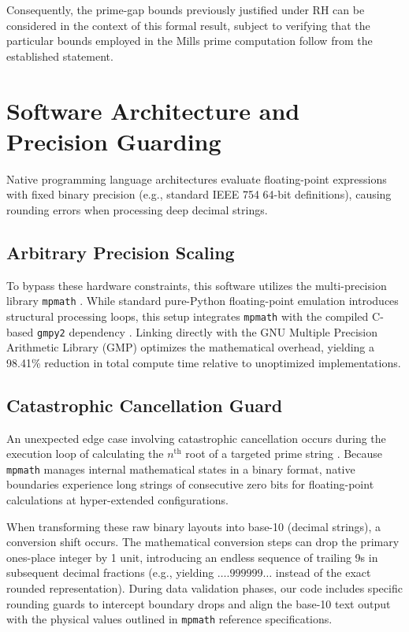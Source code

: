 \documentclass{article}
\begin{document}
Consequently, the prime-gap bounds previously justified under RH can be considered in the context of this formal result, subject to verifying that the particular bounds employed in the Mills prime computation follow from the established statement.
\section{Software Architecture and Precision Guarding}
Native programming language architectures evaluate floating-point expressions with fixed binary precision (e.g., standard IEEE 754 64-bit definitions), causing rounding errors when processing deep decimal strings.

\subsection{Arbitrary Precision Scaling}
To bypass these hardware constraints, this software utilizes the multi-precision library \texttt{mpmath} \cite{mpmathIndex}. While standard pure-Python floating-point emulation introduces structural processing loops, this setup integrates \texttt{mpmath} with the compiled C-based \texttt{gmpy2} dependency \cite{mpmathGmpy}. Linking directly with the GNU Multiple Precision Arithmetic Library (GMP) optimizes the mathematical overhead, yielding a 98.41\% reduction in total compute time relative to unoptimized implementations.

\subsection{Catastrophic Cancellation Guard}
An unexpected edge case involving catastrophic cancellation occurs during the execution loop of calculating the $n^{\text{th}}$ root of a targeted prime string \cite{mpmathRoots}. Because \texttt{mpmath} manages internal mathematical states in a binary format, native boundaries experience long strings of consecutive zero bits for floating-point calculations at hyper-extended configurations.

When transforming these raw binary layouts into base-10 (decimal strings), a conversion shift occurs. The mathematical conversion steps can drop the primary ones-place integer by 1 unit, introducing an endless sequence of trailing 9s in subsequent decimal fractions (e.g., yielding $\dots.999999\dots$ instead of the exact rounded representation). During data validation phases, our code includes specific rounding guards to intercept boundary drops and align the base-10 text output with the physical values outlined in \texttt{mpmath} reference specifications.
\end{document}
